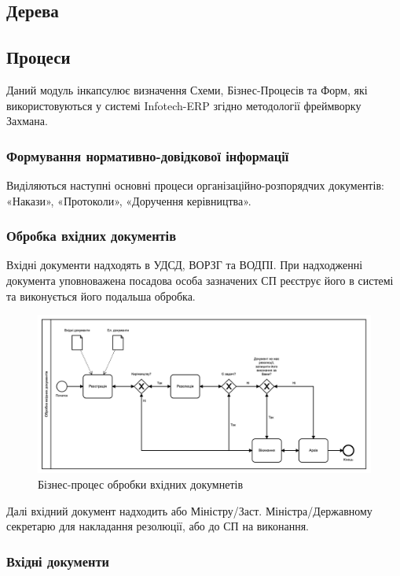 \subsection{Дерева}

\newpage
\subsection{Процеси}

Даний модуль інкапсулює визначення Схеми, Бізнес-Процесів та Форм,
які використовуються у системі Infotech-ERP згідно методології фреймворку Захмана.

\subsubsection{Формування нормативно-довідкової інформації}

Виділяються наступні основні процеси організаційно-розпорядчих
документів: «Накази», «Протоколи», «Доручення керівництва».

\subsubsection{Обробка вхідних документів}

Вхідні документи надходять в УДСД, ВОРЗГ та ВОДПІ.
При надходженні документа уповноважена посадова особа зазначених
СП реєструє його в системі та виконується його подальша обробка.

\begin{figure}[!htbp]
\centerline{\includegraphics[scale=0.25]{handleInputDoc.png}}
\caption{Бізнес-процес обробки вхідних докумнетів}
\end{figure}

Далі вхідний документ надходить або Міністру/Заст. Міністра/Державному
секретарю для накладання резолюції, або до СП на виконання.

\subsubsection{Вхідні документи}

